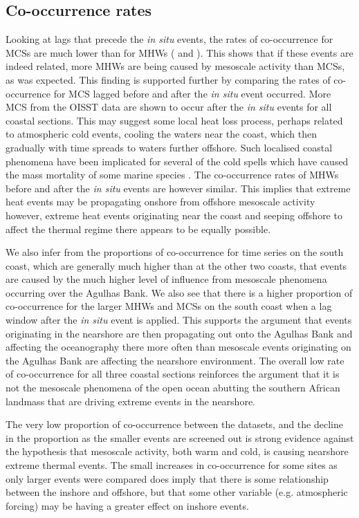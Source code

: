 \documentclass[a4paper,10pt,review]{elsarticle}
\begin{document}
\subsection{Co-occurrence rates}
Looking at lags that precede the \emph{in situ} events, the rates of co-occurrence for MCSs are much lower than for MHWs ( and ). This shows that if these events are indeed related, more MHWs are being caused by mesoscale activity than MCSs, as was expected. This finding is supported further by comparing the rates of co-occurrence for MCS lagged before and after the \emph{in situ} event occurred. More MCS from the OISST data are shown to occur after the \emph{in situ} events for all coastal sections. This may suggest some local heat loss process, perhaps related to atmospheric cold events, cooling the waters near the coast, which then gradually with time spreads to waters further offshore. Such localised coastal phenomena have been implicated for several of the cold spells which have caused the mass mortality of some marine species \citep[e.g.][]{Gunter1941, Firth2011}. The co-occurrence rates of MHWs before and after the \emph{in situ} events are however similar. This implies that extreme heat events may be propagating onshore from offshore mesoscale activity however, extreme heat events originating near the coast and seeping offshore to affect the thermal regime there appears to be equally possible.

We also infer from the proportions of co-occurrence for time series on the south coast, which are generally much higher than at the other two coasts, that events are caused by the much higher level of influence from mesoscale phenomena occurring over the Agulhas Bank. We also see that there is a higher proportion of co-occurrence for the larger MHWs and MCSs on the south coast when a lag window after the \emph{in situ} event is applied. This supports the argument that events originating in the nearshore are then propagating out onto the Agulhas Bank and affecting the oceanography there more often than mesoscale events originating on the Agulhas Bank are affecting the nearshore environment. The overall low rate of co-occurrence for all three coastal sections reinforces the argument that it is not the mesoscale phenomena of the open ocean abutting the southern African landmass that are driving extreme events in the nearshore.

The very low proportion of co-occurrence between the datasets, and the decline in the proportion as the smaller events are screened out is strong evidence against the hypothesis that mesoscale activity, both warm and cold, is causing nearshore extreme thermal events. The small increases in co-occurrence for some sites as only larger events were compared does imply that there is some relationship between the inshore and offshore, but that some other variable (e.g. atmospheric forcing) may be having a greater effect on inshore events.
\end{document}
